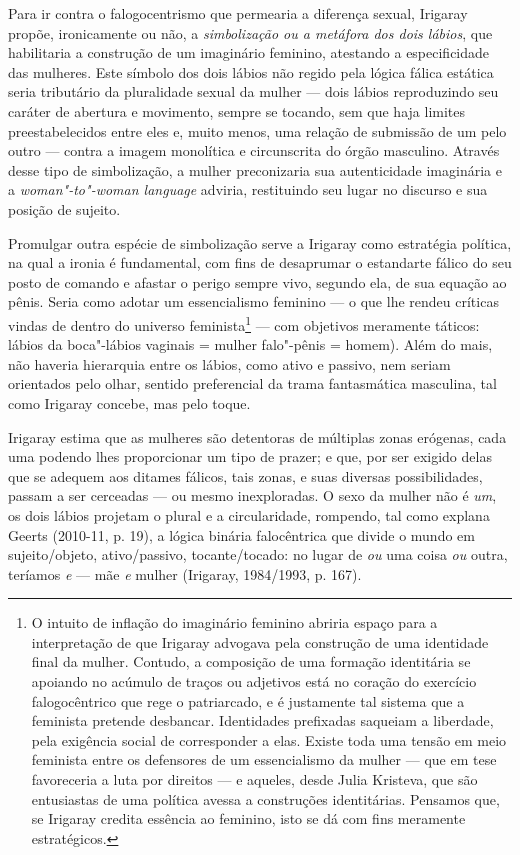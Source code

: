 Para ir contra o falogocentrismo que permearia a diferença sexual,
Irigaray propõe, ironicamente ou não, a \emph{simbolização ou a metáfora
dos dois lábios}, que habilitaria a construção de um imaginário
feminino, atestando a especificidade das mulheres. Este símbolo dos dois
lábios não regido pela lógica fálica estática seria tributário da
pluralidade sexual da mulher --- dois lábios reproduzindo seu caráter de
abertura e movimento, sempre se tocando, sem que haja limites
preestabelecidos entre eles e, muito menos, uma relação de submissão de
um pelo outro --- contra a imagem monolítica e circunscrita do órgão
masculino. Através desse tipo de simbolização, a mulher preconizaria sua
autenticidade imaginária e a \emph{woman"-to"-woman language} adviria,
restituindo seu lugar no discurso e sua posição de sujeito.

Promulgar outra espécie de simbolização serve a Irigaray como estratégia
política, na qual a ironia é fundamental, com fins de desaprumar o
estandarte fálico do seu posto de comando e afastar o perigo sempre
vivo, segundo ela, de sua equação ao pênis. Seria como adotar um
essencialismo feminino --- o que lhe rendeu críticas vindas de dentro do
universo feminista\footnote{O intuito de inflação do imaginário feminino
  abriria espaço para a interpretação de que Irigaray advogava pela
  construção de uma identidade final da mulher. Contudo, a composição de
  uma formação identitária se apoiando no acúmulo de traços ou adjetivos
  está no coração do exercício falogocêntrico que rege o patriarcado, e
  é justamente tal sistema que a feminista pretende desbancar.
  Identidades prefixadas saqueiam a liberdade, pela exigência social de
  corresponder a elas. Existe toda uma tensão em meio feminista entre os
  defensores de um essencialismo da mulher --- que em tese favoreceria a
  luta por direitos --- e aqueles, desde Julia Kristeva, que são
  entusiastas de uma política avessa a construções identitárias.
  Pensamos que, se Irigaray credita essência ao feminino, isto se dá com
  fins meramente estratégicos.} --- com objetivos meramente táticos:
lábios da boca"-lábios vaginais = mulher  falo"-pênis = homem). Além do
mais, não haveria hierarquia entre os lábios, como ativo e passivo, nem
seriam orientados pelo olhar, sentido preferencial da trama fantasmática
masculina, tal como Irigaray concebe, mas pelo toque.

Irigaray estima que as mulheres são detentoras de múltiplas zonas
erógenas, cada uma podendo lhes proporcionar um tipo de prazer; e que,
por ser exigido delas que se adequem aos ditames fálicos, tais zonas, e
suas diversas possibilidades, passam a ser cerceadas --- ou mesmo
inexploradas. O sexo da mulher não é \emph{um}, os dois lábios projetam
o plural e a circularidade, rompendo, tal como explana Geerts (2010-11,
p. 19), a lógica binária falocêntrica que divide o mundo em
sujeito/objeto, ativo/passivo, tocante/tocado: no lugar de \emph{ou} uma
coisa \emph{ou} outra, teríamos \emph{e} --- mãe \emph{e} mulher
(Irigaray, 1984/1993, p. 167).

